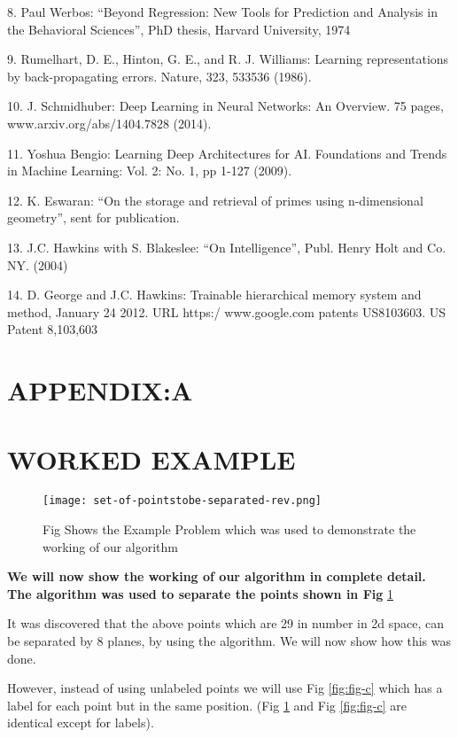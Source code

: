 \documentclass[english]{article}
\begin{document}
8. Paul Werbos: {}``Beyond Regression: New Tools for Prediction
and Analysis in the Behavioral Sciences'', PhD thesis, Harvard University,
1974

9. Rumelhart, D. E., Hinton, G. E., and R. J. Williams: Learning
representations by back-propagating errors. Nature, 323, 533\textendash{}536
(1986).

10. J. Schmidhuber: Deep Learning in Neural Networks: An Overview.
75 pages, www.arxiv.org/abs/1404.7828 (2014).

11. Yoshua Bengio: Learning Deep Architectures for AI. Foundations
and Trends in Machine Learning: Vol. 2: No. 1, pp 1-127 (2009).

12. K. Eswaran: {}``On the storage and retrieval of primes using
n-dimensional geometry'', sent for publication.

13. J.C. Hawkins with S. Blakeslee: {}``On Intelligence'',
Publ. Henry Holt and Co. NY. (2004)

14. D. George and J.C. Hawkins: Trainable hierarchical memory
system and method, January 24 2012. URL https:/ www.google.com patents
US8103603. US Patent 8,103,603

\section{APPENDIX:A }


\section*{WORKED EXAMPLE}

\begin{figure}[htp]
 \begin{center}
 \texttt{[image: set-of-pointstobe-separated-rev.png]}

\caption{Fig Shows the Example Problem which was used to demonstrate the working of our algorithm}

\label{fig:fig-b} \end{center}
\end{figure} 

\textbf{We will now show the working of our algorithm in complete
detail. The algorithm was used to separate the points shown in Fig } \ref{fig:fig-b}

It was discovered that the above points which are 29 in number in
2d space, can be separated by 8 planes, by using the algorithm. We
will now show how this was done. 

However, instead of using unlabeled points we will use Fig \ref{fig:fig-c} which
has a label for each point but in the same position. (Fig \ref{fig:fig-b} and Fig
\ref{fig:fig-c} are identical except for labels).
\end{document}
